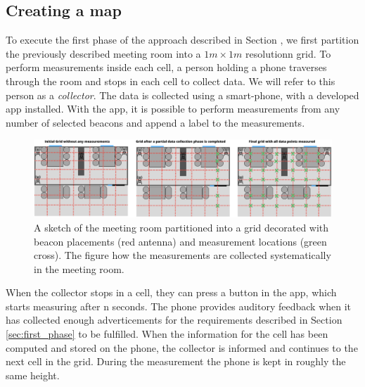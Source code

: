 \subsection{Creating a map}
To execute the first phase of the approach described in Section \label{sec:first_phase}, we first partition the previously described meeting room into a $1m \times 1m$ resolutionn grid.
To perform measurements inside each cell, a person holding a phone traverses through the room and stops in each cell to collect data. We will refer to this person as a \textit{collector}.
The data is collected using a smart-phone, with a developed app installed.   
With the app, it is possible to perform measurements from any number of selected beacons and append a label to the measurements.
\begin{figure}[h]
    \centering
    \includegraphics[scale=0.7]{images/experiment_map_creation.png}
    \caption{A sketch of the meeting room partitioned into a grid decorated with beacon placements (red antenna) and measurement locations (green cross). The figure how the measurements are collected systematically in the meeting room.}
    \label{fig:experiment_map_creation}
\end{figure}

When the collector stops in a cell, they can press a button in the app, which starts measuring after n seconds. 
The phone provides auditory feedback when it has collected enough adverticements for the requirements described in Section \ref{sec:first_phase} to be fulfilled.
When the information for the cell has been computed and stored on the phone, the collector is informed and continues to the next cell in the grid. 
During the measurement the phone is kept in roughly the same height.


